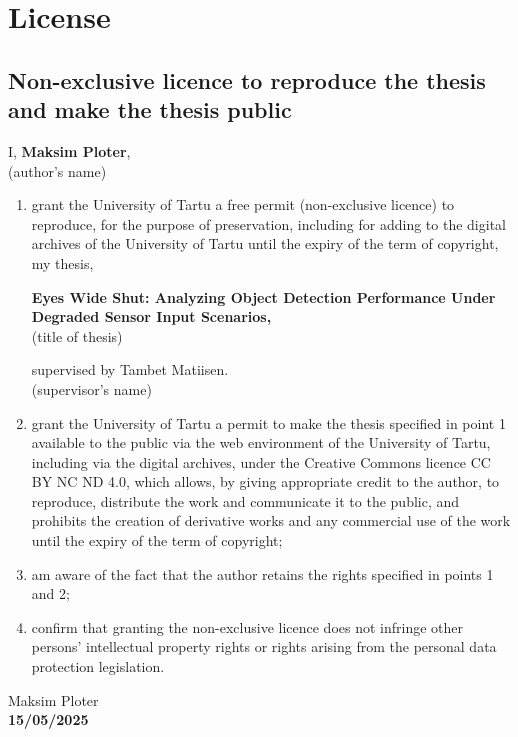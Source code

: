 \section*{License} \label{license} 

\subsection*{Non-exclusive licence to reproduce the thesis and make the thesis public}

I, \textbf{Maksim Ploter},\\
\hspace*{2em}(author’s name)

\begin{enumerate}
    \item grant the University of Tartu a free permit (non-exclusive licence) to reproduce, for the purpose of preservation, including for adding to the digital archives of the University of Tartu until the expiry of the term of copyright, my thesis,
    
    \textbf{Eyes Wide Shut: Analyzing Object Detection Performance Under Degraded Sensor Input Scenarios,}\\
    \hspace*{2em}(title of thesis)
    
    supervised by Tambet Matiisen.\\
    \hspace*{2em}(supervisor’s name)
    \item grant the University of Tartu a permit to make the thesis specified in point 1 available to the public via the web environment of the University of Tartu, including via the digital archives, under the Creative Commons licence CC BY NC ND 4.0, which allows, by giving appropriate credit to the author, to reproduce, distribute the work and communicate it to the public, and prohibits the creation of derivative works and any commercial use of the work until the expiry of the term of copyright;
    \item am aware of the fact that the author retains the rights specified in points 1 and 2;
    \item confirm that granting the non-exclusive licence does not infringe other persons’ intellectual property rights or rights arising from the personal data protection legislation. 
\end{enumerate}

\vspace{2em} %

\noindent Maksim Ploter \\
\textbf{15/05/2025}



